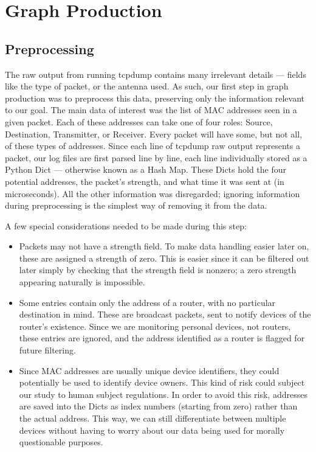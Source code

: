 \section{Graph Production}

\subsection{Preprocessing}

The raw output from running tcpdump contains many irrelevant details --- fields like the type of packet, or the antenna used.
As such, our first step in graph production was to preprocess this data, preserving only the information relevant to our goal.
The main data of interest was the list of MAC addresses seen in a given packet.
Each of these addresses can take one of four roles: Source, Destination, Transmitter, or Receiver.
Every packet will have some, but not all, of these types of addresses.
Since each line of tcpdump raw output represents a packet, our log files are first parsed line by line, each line individually stored as a Python Dict --- otherwise known as a Hash Map.
These Dicts hold the four potential addresses, the packet's strength, and what time it was sent at (in microseconds).
All the other information was disregarded; ignoring information during preprocessing is the simplest way of removing it from the data.


A few special considerations needed to be made during this step:
\begin{itemize}
\item Packets may not have a strength field.
  To make data handling easier later on, these are assigned a strength of zero.
  This is easier since it can be filtered out later simply by checking that the strength field is nonzero; a zero strength appearing naturally is impossible. 
\item Some entries contain only the address of a router, with no particular destination in mind.
  These are broadcast packets, sent to notify devices of the router's existence.
  Since we are monitoring personal devices, not routers, these entries are ignored, and the address identified as a router is flagged for future filtering.
\item Since MAC addresses are usually unique device identifiers, they could potentially be used to identify device owners.
  This kind of risk could subject our study to human subject regulations.
  In order to avoid this risk, addresses are saved into the Dicts as index numbers (starting from zero) rather than the actual address.
  This way, we can still differentiate between multiple devices without having to worry about our data being used for morally questionable purposes.
\end{itemize}

